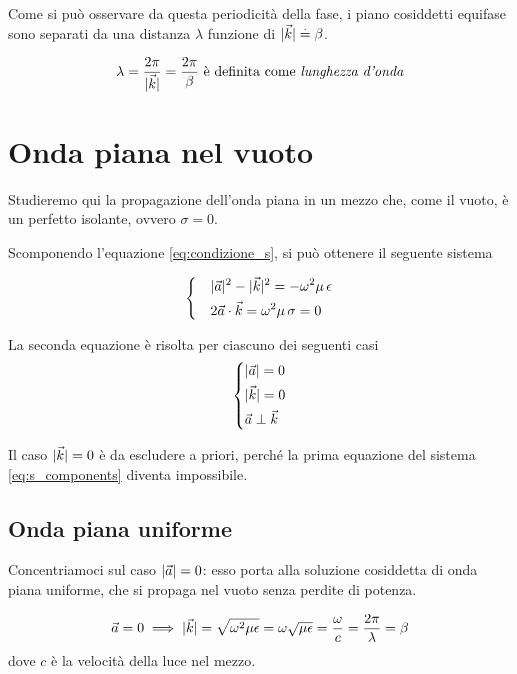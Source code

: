 \begin{itemize}
		Come si può osservare da questa periodicità della fase, i piano cosiddetti equifase sono separati da una distanza $\lambda$ funzione di $|\vec{k}| \stackrel{.}{=} \beta$.

		\begin{equation} \label{eq:lunghezza_donda}
			\lambda = \frac{2 \pi}{|\vec{k}|} = \frac{2 \pi}{\beta} \text{ è definita come \emph{lunghezza d'onda}}
		\end{equation}
	\end{itemize}

\section{Onda piana nel vuoto}
	Studieremo qui la propagazione dell'onda piana in un mezzo che, come il vuoto, è un perfetto isolante, ovvero $\sigma = 0$.

	Scomponendo l'equazione \ref{eq:condizione_s}, si può ottenere il seguente sistema

	\begin{equation} \label{eq:s_components}
		\begin{dcases}
			& |\vec{a}|^2 - |\vec{k}|^2 = - \omega^2 \mu \, \epsilon \\
			& 2 \vec{a} \cdot \vec{k} = \omega^2 \mu \, \sigma = 0
		\end{dcases}
	\end{equation}

	La seconda equazione è risolta per ciascuno dei seguenti casi
	\begin{equation}\begin{dcases}
		|\vec{a}| = 0 \\
		|\vec{k}| = 0 \\
		\vec{a} \perp \vec{k}
	\end{dcases}\end{equation}

	Il caso $|\vec{k}| = 0$ è da escludere a priori, perché la prima equazione del sistema \ref{eq:s_components} diventa impossibile.

	\subsection{Onda piana uniforme}
		Concentriamoci sul caso $|\vec{a}| = 0$: esso porta alla soluzione cosiddetta di onda piana uniforme, che si propaga nel vuoto senza perdite di potenza.

		\begin{equation*}
				\vec{a} = 0 \implies |\vec{k}| = \sqrt{\omega^2 \mu \epsilon} = \omega \sqrt{\mu \epsilon} = \frac{\omega}{c} = \frac{2 \pi}{\lambda} = \beta
		\end{equation*}
		dove $c$ è la velocità della luce nel mezzo.

